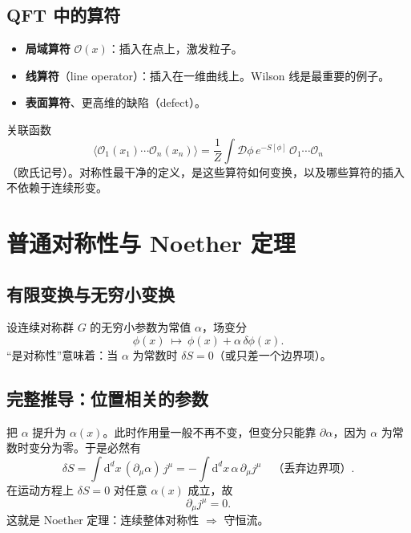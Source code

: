 \documentclass[11pt,a4paper]{article}
\theoremstyle{definition}
\theoremstyle{plain}
\theoremstyle{remark}
\newcommand{\dd}{\mathrm{d}}
\begin{document}
\subsection{QFT 中的算符}

\begin{itemize}[leftmargin=1.4em]
  \item \textbf{局域算符} $\mathcal{O}(x)$：插入在点上，激发粒子。
  \item \textbf{线算符}（line operator）：插入在一维曲线上。Wilson 线是最重要的例子。
  \item \textbf{表面算符}、更高维的缺陷（defect）。
\end{itemize}
关联函数
\begin{equation}
  \langle \mathcal{O}_1(x_1)\cdots\mathcal{O}_n(x_n)\rangle
  =\frac{1}{Z}\int \mathcal{D}\phi\, e^{-S[\phi]}\,\mathcal{O}_1\cdots\mathcal{O}_n
\end{equation}
（欧氏记号）。对称性最干净的定义，是这些算符如何变换，以及哪些算符的插入不依赖于连续形变。

\section{普通对称性与 Noether 定理}
\label{sec:noether}

\subsection{有限变换与无穷小变换}

设连续对称群 $G$ 的无穷小参数为常值 $\alpha$，场变分
\begin{equation}
  \phi(x)\ \mapsto\ \phi(x)+\alpha\,\delta\phi(x).
\end{equation}
``是对称性''意味着：当 $\alpha$ 为常数时 $\delta S=0$（或只差一个边界项）。

\subsection{完整推导：位置相关的参数}

把 $\alpha$ 提升为 $\alpha(x)$。此时作用量一般不再不变，但变分只能靠 $\partial\alpha$，因为 $\alpha$ 为常数时变分为零。于是必然有
\begin{equation}
\label{eq:noether-var}
  \delta S=\int \dd^d x\,(\partial_\mu\alpha)\, j^\mu
  =-\int \dd^d x\,\alpha\,\partial_\mu j^\mu
  \quad\text{（丢弃边界项）}.
\end{equation}
在运动方程上 $\delta S=0$ 对任意 $\alpha(x)$ 成立，故
\begin{equation}
\label{eq:cons}
  \partial_\mu j^\mu=0.
\end{equation}
这就是 Noether 定理：连续整体对称性 $\Rightarrow$ 守恒流。
\end{document}
